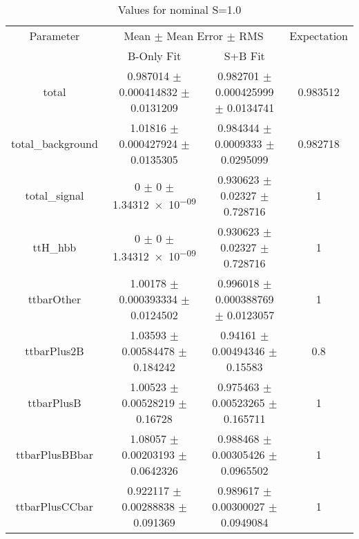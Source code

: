 \begin{table}
\centering
\caption{Values for nominal S=1.0}
\begin{tabular}{cccc}
\toprule
Parameter & \multicolumn{2}{c}{Mean $\pm$ Mean Error $\pm$ RMS} & Expectation\\
 & B-Only Fit & S+B Fit & \\
\midrule
total & \num{0.987014} $\pm$ \num{0.000414832} $\pm$ \num{0.0131209} & \num{0.982701} $\pm$ \num{0.000425999} $\pm$ \num{0.0134741} & \num{0.983512}\\
total\_background & \num{1.01816} $\pm$ \num{0.000427924} $\pm$ \num{0.0135305} & \num{0.984344} $\pm$ \num{0.0009333} $\pm$ \num{0.0295099} & \num{0.982718}\\
total\_signal & \num{0} $\pm$ \num{0} $\pm$ \num{1.34312e-09} & \num{0.930623} $\pm$ \num{0.02327} $\pm$ \num{0.728716} & \num{1}\\
ttH\_hbb & \num{0} $\pm$ \num{0} $\pm$ \num{1.34312e-09} & \num{0.930623} $\pm$ \num{0.02327} $\pm$ \num{0.728716} & \num{1}\\
ttbarOther & \num{1.00178} $\pm$ \num{0.000393334} $\pm$ \num{0.0124502} & \num{0.996018} $\pm$ \num{0.000388769} $\pm$ \num{0.0123057} & \num{1}\\
ttbarPlus2B & \num{1.03593} $\pm$ \num{0.00584478} $\pm$ \num{0.184242} & \num{0.94161} $\pm$ \num{0.00494346} $\pm$ \num{0.15583} & \num{0.8}\\
ttbarPlusB & \num{1.00523} $\pm$ \num{0.00528219} $\pm$ \num{0.16728} & \num{0.975463} $\pm$ \num{0.00523265} $\pm$ \num{0.165711} & \num{1}\\
ttbarPlusBBbar & \num{1.08057} $\pm$ \num{0.00203193} $\pm$ \num{0.0642326} & \num{0.988468} $\pm$ \num{0.00305426} $\pm$ \num{0.0965502} & \num{1}\\
ttbarPlusCCbar & \num{0.922117} $\pm$ \num{0.00288838} $\pm$ \num{0.091369} & \num{0.989617} $\pm$ \num{0.00300027} $\pm$ \num{0.0949084} & \num{1}\\
\bottomrule
\end{tabular}
\end{table}